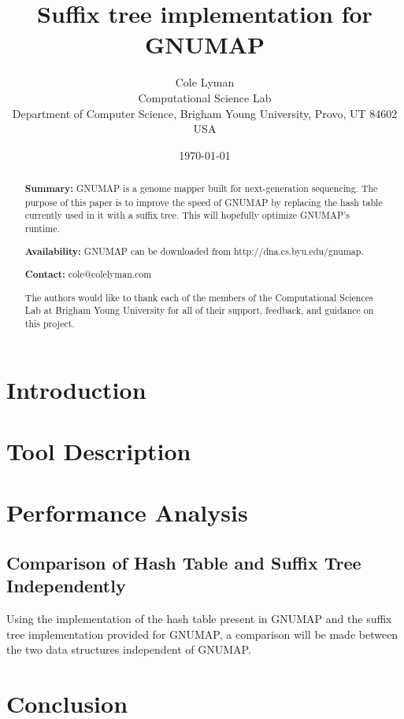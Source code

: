\documentclass{bmc_article}
\title{Suffix tree implementation for GNUMAP}
\author{Cole Lyman\\
\small Computational Science Lab\\
\small Department of Computer Science, Brigham Young University, Provo, UT 84602 USA\\
}
\date{\today}
\begin{document}
\maketitle

\begin{abstract}
\textbf{Summary:} GNUMAP\cite{gnumap} is a genome mapper built for next-generation sequencing. 
The purpose of this paper is to improve the speed of GNUMAP by replacing the hash table currently 
used in it with a suffix tree. This will hopefully optimize GNUMAP's runtime.

\textbf{Availability:} GNUMAP can be downloaded from http://dna.cs.byu.edu/gnumap.

\textbf{Contact:} cole@colelyman.com
\end{abstract}

\section{Introduction}

\section{Tool Description}

\section{Performance Analysis}
\subsection{Comparison of Hash Table and Suffix Tree Independently} 
Using the implementation of the hash table present in GNUMAP and the suffix tree implementation
provided for GNUMAP, a comparison will be made between the two data structures independent of 
GNUMAP. 

\section{Conclusion}

\renewcommand{\abstractname}{Acknowledgements}
\begin{abstract}
The authors would like to thank each of the members of the Computational Sciences Lab at Brigham Young University for all of
their support, feedback, and guidance on this project.
\end{abstract} 



\end{document}
